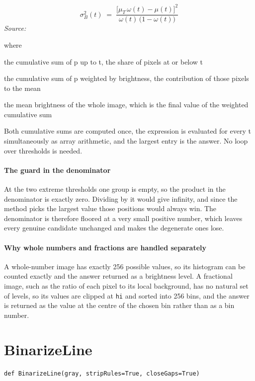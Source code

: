 \begin{equation}
\sigma_B^2(t)\;=\;\frac{\big[\mu_T\,\omega(t)-\mu(t)\big]^2}{\omega(t)\,\big(1-\omega(t)\big)}
\end{equation}
\noindent\emph{Source: }\cite{otsu1979}


\noindent where
\begin{description}[leftmargin=2.4em,style=nextline,font=\normalfont\ttfamily]\setlength\itemsep{1pt}
  \item[{$\omega(t)$}] \normalfont the cumulative sum of p up to t, the share of pixels at or below t
  \item[{$\mu(t)$}] \normalfont the cumulative sum of p weighted by brightness, the contribution of those pixels to the mean
  \item[{$\mu_T$}] \normalfont the mean brightness of the whole image, which is the final value of the weighted cumulative sum
\end{description}
Both cumulative sums are computed once, the expression is evaluated for every t simultaneously as array arithmetic, and the largest entry is the answer. No loop over thresholds is needed.


\paragraph{The guard in the denominator}
At the two extreme thresholds one group is empty, so the product in the denominator is exactly zero. Dividing by it would give infinity, and since the method picks the largest value those positions would always win. The denominator is therefore floored at a very small positive number, which leaves every genuine candidate unchanged and makes the degenerate ones lose.


\paragraph{Why whole numbers and fractions are handled separately}
A whole-number image has exactly 256 possible values, so its histogram can be counted exactly and the answer returned as a brightness level. A fractional image, such as the ratio of each pixel to its local background, has no natural set of levels, so its values are clipped at \texttt{hi} and sorted into 256 bins, and the answer is returned as the value at the centre of the chosen bin rather than as a bin number.


\section{BinarizeLine}
\begin{lstlisting}[style=sig]
def BinarizeLine(gray, stripRules=True, closeGaps=True)
\end{lstlisting}

